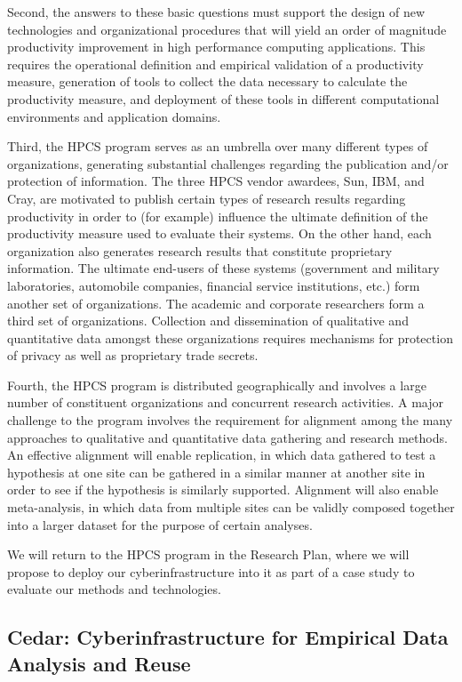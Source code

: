 Second, the answers to these basic questions must support the design of new
technologies and organizational procedures that will yield an order of
magnitude productivity improvement in high performance computing
applications.  This requires the operational definition and empirical validation 
of a productivity measure, generation of tools to collect the data necessary
to calculate the productivity measure, and deployment of these tools in different
computational environments and application domains. 

Third, the HPCS program serves as an umbrella over many different types of
organizations, generating substantial challenges regarding the publication
and/or protection of information.  The three HPCS vendor awardees, Sun,
IBM, and Cray, are motivated to publish certain types of research
results regarding productivity in order to (for example) influence the
ultimate definition of the productivity measure used to evaluate their
systems. On the other hand, each organization also generates research
results that constitute proprietary information. The ultimate end-users of
these systems (government and military laboratories, automobile companies,
financial service institutions, etc.)  form another set of organizations.
The academic and corporate researchers form a third set of
organizations. Collection and dissemination of qualitative and quantitative
data amongst these organizations requires mechanisms for protection of privacy 
as well as proprietary trade secrets. 

Fourth, the HPCS program is distributed geographically and involves a large
number of constituent organizations and concurrent research activities.  A
major challenge to the program involves the requirement for alignment among the many
approaches to qualitative and quantitative data gathering and research
methods.  An effective alignment will enable replication, in which data
gathered to test a hypothesis at one site can be gathered in a similar
manner at another site in order to see if the hypothesis is similarly
supported.  Alignment will also enable meta-analysis, in which data from
multiple sites can be validly composed together into a larger dataset for
the purpose of certain analyses. 

We will return to the HPCS program in the Research Plan, where we will
propose to deploy our cyberinfrastructure into it as part of a case study
to evaluate our methods and technologies.  

\subsection{Cedar: Cyberinfrastructure for Empirical Data Analysis and Reuse}
\label{sec:cedar}

